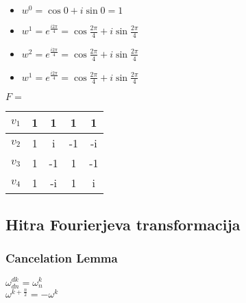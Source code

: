\documentclass{article}
\begin{document}
\begin{multicols}{2}
\begin{itemize}
    \item $w^0 = \cos0 + i\sin0 = 1$
    \item $w^1 = e^{\frac{i 2 \pi} {4}} = \cos \frac{2\pi}{4} + i\sin\frac{2\pi}{4}$
    \item $w^2 = e^{\frac{i 2 \pi} {4}} = \cos \frac{2\pi}{4} + i\sin\frac{2\pi}{4}$
    \item $w^1 = e^{\frac{i 2 \pi} {4}} = \cos \frac{2\pi}{4} + i\sin\frac{2\pi}{4}$
\end{itemize}

\begin{center}
    $F =$
    \begin{tabular}{ |c|c|c|c|c| } 
        \hline
        $v_1$ &     1 & 1 & 1 & 1 \\ 
        \hline
        $v_2$ &     1 & i & -1 & -i \\  
        \hline
        $v_3$ &     1 & -1 & 1 & -1 \\
        \hline
        $v_4$ &     1 & -i & 1 & i \\
        \hline
    \end{tabular}
\end{center}

\subsection{Hitra Fourierjeva transformacija}

\subsubsection{Cancelation Lemma}

\begin{center}
    \begin{math}
        \omega^{dk}_{dn} = \omega^{k}_{n}
    \end{math} \\
    \begin{math}
        \omega^{k + \frac{n}{2}} = -\omega^{k}
    \end{math}
\end{center}

\end{multicols}
\end{document}
